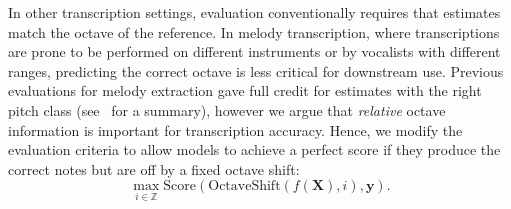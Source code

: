 In other transcription settings, evaluation conventionally requires that estimates match the octave of the reference. 
In melody transcription, where transcriptions are prone to be performed on different instruments or by vocalists with different ranges, predicting the correct octave is less critical for downstream use. 
Previous evaluations for melody extraction gave full credit for estimates with the right pitch class (see~\cite{poliner2007melody} for a summary), however we argue that \emph{relative} octave information is important for transcription accuracy. 
Hence, we modify the evaluation criteria to allow models to achieve a perfect score if they produce the correct notes but are off by a fixed octave shift:
\begin{equation*}
    \max_{i \in \mathbb{Z}} \text{Score}(\text{OctaveShift}(f(\bm{X}), i), \mathbf{y}).
\end{equation*}
